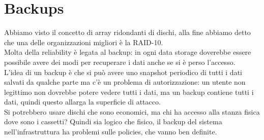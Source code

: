 \documentclass[12pt, oneside]{extbook} %
\begin{document}
\section{Backups}
Abbiamo visto il concetto di array ridondanti di dischi, alla fine abbiamo detto che una delle organizzazioni migliori è la RAID-10.\\Molta della reliability è legata al backup: in ogni data storage doverebbe essere possibile avere dei modi per recuperare i dati anche se si è perso l'accesso.\\L'idea di un backup è che si può avere uno snapshot periodico di tutti i dati salvati da qualche parte ma c'è un problema di autorizzazione: un utente non legittimo non dovrebbe potere vedere tutti i dati, ma un backup contiene tutti i dati, quindi questo allarga la superficie di attacco.\\Si potrebbero usare dischi che sono economici, ma chi ha accesso alla stanza fisica dove sono i cassetti? Quindi sia logico che fisico, il backup del sistema nell'infrastruttura ha problemi sulle policies, che vanno ben definite.
\end{document}
